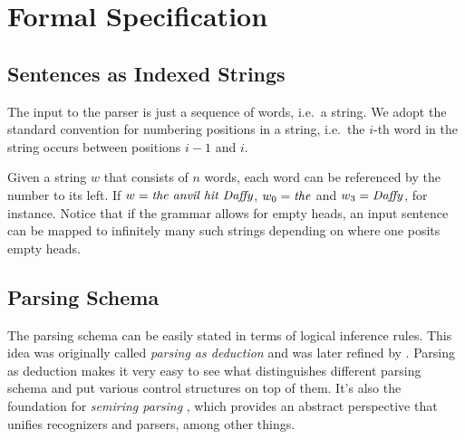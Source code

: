 \section{Formal Specification}
\label{sec:TopDown_Formal}

\subsection{Sentences as Indexed Strings}
\label{sub:TopDown_Strings}

The input to the parser is just a sequence of words, i.e.\ a string.
We adopt the standard convention for numbering positions in a string, i.e.\ the $i$-th word in the string occurs between positions $i-1$ and $i$.
%
\begin{center}
\end{center}
%
Given a string $w$ that consists of $n$ words, each word can be referenced by the number to its left.
If $w = \emph{the anvil hit Daffy}$, $w_0 = \text{\emph{the}}$ and $w_3 = \text{\emph{Daffy}}$, for instance.
Notice that if the grammar allows for empty heads, an input sentence can be mapped to infinitely many such strings depending on where one posits empty heads.

\subsection{Parsing Schema}
\label{sub:TopDown_Schema}
The parsing schema can be easily stated in terms of logical inference rules.
This idea was originally called \emph{parsing as deduction} \citep{PereiraWarren83, Shieber.etal95} and was later refined by \citet{Sikkel97}.
Parsing as deduction makes it very easy to see what distinguishes different parsing schema and put various control structures on top of them.
It's also the foundation for \emph{semiring parsing} \citep{Goodman99}, which provides an abstract perspective that unifies recognizers and parsers, among other things.

